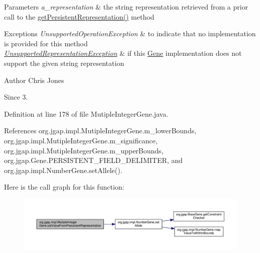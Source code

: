 \begin{DoxyParams}{Parameters}
{\em a\-\_\-representation} & the string representation retrieved from a prior call to the \hyperlink{classorg_1_1jgap_1_1impl_1_1_mutiple_integer_gene_a2ee1d1c02b875f75243d7b510961990f}{get\-Persistent\-Representation()} method\\
\hline
\end{DoxyParams}

\begin{DoxyExceptions}{Exceptions}
{\em Unsupported\-Operation\-Exception} & to indicate that no implementation is provided for this method \\
\hline
{\em \hyperlink{classorg_1_1jgap_1_1_unsupported_representation_exception}{Unsupported\-Representation\-Exception}} & if this \hyperlink{interfaceorg_1_1jgap_1_1_gene}{Gene} implementation does not support the given string representation\\
\hline
\end{DoxyExceptions}
\begin{DoxyAuthor}{Author}
Chris Jones 
\end{DoxyAuthor}
\begin{DoxySince}{Since}
3. 
\end{DoxySince}


Definition at line 178 of file Mutiple\-Integer\-Gene.\-java.



References org.\-jgap.\-impl.\-Mutiple\-Integer\-Gene.\-m\-\_\-lower\-Bounds, org.\-jgap.\-impl.\-Mutiple\-Integer\-Gene.\-m\-\_\-significance, org.\-jgap.\-impl.\-Mutiple\-Integer\-Gene.\-m\-\_\-upper\-Bounds, org.\-jgap.\-Gene.\-P\-E\-R\-S\-I\-S\-T\-E\-N\-T\-\_\-\-F\-I\-E\-L\-D\-\_\-\-D\-E\-L\-I\-M\-I\-T\-E\-R, and org.\-jgap.\-impl.\-Number\-Gene.\-set\-Allele().



Here is the call graph for this function\-:
\nopagebreak
\begin{figure}[H]
\begin{center}
\leavevmode
\includegraphics[width=350pt]{classorg_1_1jgap_1_1impl_1_1_mutiple_integer_gene_a2cf38361dd0f05d2bf89031796caa0ec_cgraph}
\end{center}
\end{figure}


